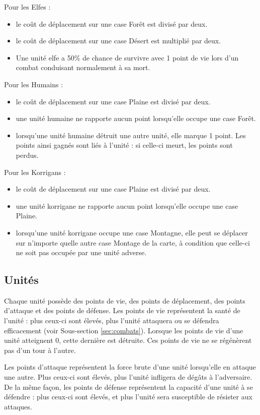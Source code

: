 		Pour les Elfes :
		\begin{itemize}
			\item le coût de déplacement sur une case Forêt est divisé par deux. 
			\item le coût de déplacement sur une case Désert est multiplié par deux.
			\item Une unité elfe a 50\% de chance de survivre avec 1 point de vie lors d’un combat conduisant normalement à sa mort.
		\end{itemize}
		
		Pour les Humains :
		\begin{itemize}
			\item le coût de déplacement sur une case Plaine est divisé par deux.
			\item une unité humaine ne rapporte aucun point lorsqu'elle occupe une case Forêt.
			\item lorsqu’une unité humaine détruit une autre unité, elle marque 1 point. Les points ainsi gagnés sont liés à l'unité : si celle-ci meurt, les points sont perdus.
		\end{itemize}
		
		Pour les Korrigans :
		\begin{itemize}
			\item le coût de déplacement sur une case Plaine est divisé par deux.
			\item une unité korrigane ne rapporte aucun point lorsqu'elle occupe une case Plaine.
			\item lorsqu'une unité korrigane occupe une case Montagne, elle peut se déplacer sur n’importe quelle autre case Montage de la carte, à condition que celle-ci ne soit pas occupée par une unité adverse.
		\end{itemize}

	\subsection{Unités}
	Chaque unité possède des points de vie, des points de déplacement, des points d'attaque et des points de défense. Les points de vie représentent la santé de l'unité : plus ceux-ci sont élevés, plus l'unité attaquera ou se défendra efficacement (voir Sous-section \ref{sec:combats}). Lorsque les points de vie d'une unité atteignent 0, cette dernière est détruite. Ces points de vie ne se régénèrent pas d'un tour à l'autre.
	
	Les points d'attaque représentent la force brute d'une unité lorsqu'elle en attaque une autre.  Plus ceux-ci sont élevés, plus l'unité infligera de dégâts à l'adversaire. De la même façon, les points de défense représentent la capacité d'une unité à se défendre : plus ceux-ci sont élevés, et plus l'unité sera susceptible de résister aux attaques. 
	
